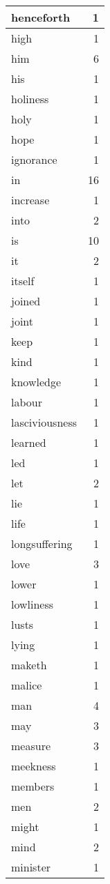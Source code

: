\begin{center}
\begin{longtable}{l|r}
henceforth & 1\\ \hline 
high & 1\\ \hline 
him & 6\\ \hline 
his & 1\\ \hline 
holiness & 1\\ \hline 
holy & 1\\ \hline 
hope & 1\\ \hline 
ignorance & 1\\ \hline 
in & 16\\ \hline 
increase & 1\\ \hline 
into & 2\\ \hline 
is & 10\\ \hline 
it & 2\\ \hline 
itself & 1\\ \hline 
joined & 1\\ \hline 
joint & 1\\ \hline 
keep & 1\\ \hline 
kind & 1\\ \hline 
knowledge & 1\\ \hline 
labour & 1\\ \hline 
lasciviousness & 1\\ \hline 
learned & 1\\ \hline 
led & 1\\ \hline 
let & 2\\ \hline 
lie & 1\\ \hline 
life & 1\\ \hline 
longsuffering & 1\\ \hline 
love & 3\\ \hline 
lower & 1\\ \hline 
lowliness & 1\\ \hline 
lusts & 1\\ \hline 
lying & 1\\ \hline 
maketh & 1\\ \hline 
malice & 1\\ \hline 
man & 4\\ \hline 
may & 3\\ \hline 
measure & 3\\ \hline 
meekness & 1\\ \hline 
members & 1\\ \hline 
men & 2\\ \hline 
might & 1\\ \hline 
mind & 2\\ \hline 
minister & 1\\ \hline 

\end{longtable}
\end{center}
